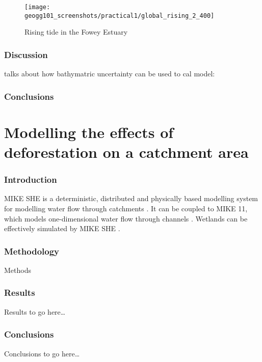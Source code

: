 \documentclass{article}
\begin{document}
\begin{figure}[hbp]
    \centering
    \texttt{[image: geogg101\_screenshots/practical1/global\_rising\_2\_400]}
    \caption{Rising tide in the Fowey Estuary}
    \label{fig:rising_tide}
\end{figure}

\section{Discussion}

talks about how bathymatric uncertainty can be used to cal model: \textcite{cea2012bathymetric}

\section{Conclusions}

\printbibliography[filter=practical1]

\newpage
\setcounter{section}{0}


\part*{Modelling the effects of deforestation on a catchment area}

\section{Introduction}
MIKE SHE is a deterministic, distributed and physically based modelling system for modelling water flow through catchments \parencite{refshaard1995mike}. It can be coupled to MIKE 11, which models one-dimensional water flow through channels \parencite{havno1995mike}. Wetlands can be effectively simulated by MIKE SHE \parencite{thompson2004simulation}. 

\section{Methodology}
Methods

\section{Results}
Results to go here\ldots

\section{Conclusions}
Conclusions to go here\ldots

\printbibliography[filter=practical2]
\end{document}
